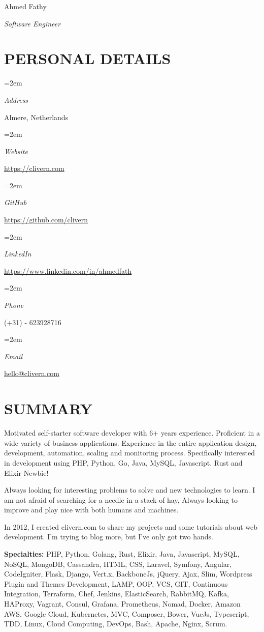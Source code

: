 \documentclass[paper=a4,fontsize=11pt]{scrartcl} %
\newlength{\spacebox}
\newcommand{\sepspace}{\vspace*{1em}}		%
\newcommand{\MyName}[1]{ %
		\Huge \usefont{OT1}{phv}{b}{n} \hfill #1
		\par \normalsize \normalfont}
\newcommand{\MySlogan}[1]{ %
		\large \usefont{OT1}{phv}{m}{n}\hfill \textit{#1}
		\par \normalsize \normalfont}
\newcommand{\NewPart}[1]{\section*{\uppercase{#1}}}
\newcommand{\PersonalEntry}[2]{
		\noindent\hangindent=2em\hangafter=0 %
		\parbox{\spacebox}{        %
		\textit{#1}}		       %
		\hspace{1.5em} #2 \par}    %
\begin{document}

\MyName{Ahmed Fathy}
\MySlogan{Software Engineer}

\sepspace


\NewPart{Personal details}{}

\PersonalEntry{Address}{Almere, Netherlands}
\PersonalEntry{Website}{\url{https://clivern.com}}
\PersonalEntry{GitHub}{\url{https://github.com/clivern}}
\PersonalEntry{LinkedIn}{\url{https://www.linkedin.com/in/ahmedfath}}
\PersonalEntry{Phone}{(+31) - 623928716}
\PersonalEntry{Email}{\url{hello@clivern.com}}


\NewPart{Summary}{}

Motivated self-starter software developer with 6+ years experience. Proficient in a wide variety of business applications. Experience in the entire application design, development, automation, scaling and monitoring process.
Specifically interested in development using PHP, Python, Go, Java, MySQL, Javascript. Rust and Elixir Newbie!

\sepspace

Always looking for interesting problems to solve and new technologies to learn. I am not afraid of searching for a needle in a stack of hay, Always looking to improve and play nice with both humans and machines.

\sepspace

In 2012, I created clivern.com to share my projects and some tutorials about web development. I'm trying to blog more, but I've only got two hands.

\sepspace

\textbf{Specialties:} PHP, Python, Golang, Rust, Elixir, Java, Javascript, MySQL, NoSQL, MongoDB, Cassandra, HTML, CSS, Laravel, Symfony, Angular, CodeIgniter, Flask, Django, Vert.x, BackboneJs, jQuery, Ajax, Slim, Wordpress Plugin and Themes Development, LAMP, OOP, VCS, GIT, Continuous Integration, Terraform, Chef, Jenkins, ElasticSearch, RabbitMQ, Kafka, HAProxy, Vagrant, Consul, Grafana, Prometheus, Nomad, Docker, Amazon AWS, Google Cloud, Kubernetes, MVC, Composer, Bower, VueJs, Typescript, TDD, Linux, Cloud Computing, DevOps, Bash, Apache, Nginx, Scrum.
\end{document}
